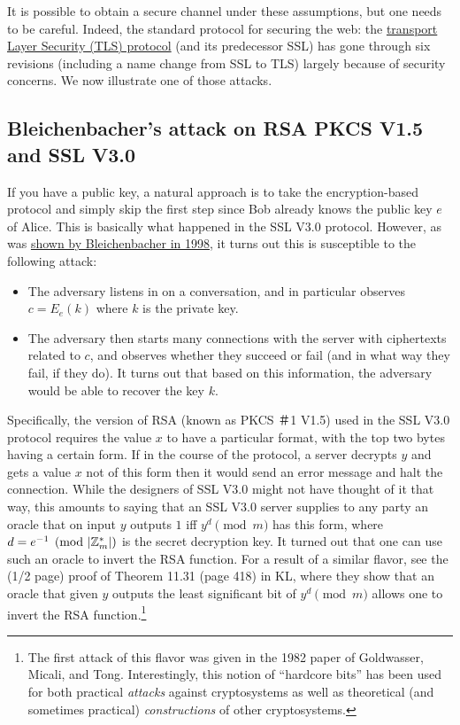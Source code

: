 It is possible to obtain a secure channel under these assumptions, but
one needs to be careful. Indeed, the standard protocol for securing the
web: the \href{https://goo.gl/md9Bsa}{transport Layer Security (TLS)
protocol} (and its predecessor SSL) has gone through six revisions
(including a name change from SSL to TLS) largely because of security
concerns. We now illustrate one of those attacks.

\subsection{Bleichenbacher's attack on RSA PKCS V1.5 and SSL
V3.0}\label{12-Bleichenbachers-attack}

If you have a public key, a natural approach is to take the
encryption-based protocol and simply skip the first step since Bob
already knows the public key \(e\) of Alice. This is basically what
happened in the SSL V3.0 protocol. However, as was
\href{http://archiv.infsec.ethz.ch/education/fs08/secsem/bleichenbacher98.pdf}{shown
by Bleichenbacher in 1998}, it turns out this is susceptible to the
following attack:

\begin{itemize}
\item
  The adversary listens in on a conversation, and in particular observes
  \(c=E_e(k)\) where \(k\) is the private key.
\item
  The adversary then starts many connections with the server with
  ciphertexts related to \(c\), and observes whether they succeed or
  fail (and in what way they fail, if they do). It turns out that based
  on this information, the adversary would be able to recover the key
  \(k\).
\end{itemize}

Specifically, the version of RSA (known as PKCS ＃1 V1.5) used in the
SSL V3.0 protocol requires the value \(x\) to have a particular format,
with the top two bytes having a certain form. If in the course of the
protocol, a server decrypts \(y\) and gets a value \(x\) not of this
form then it would send an error message and halt the connection. While
the designers of SSL V3.0 might not have thought of it that way, this
amounts to saying that an SSL V3.0 server supplies to any party an
oracle that on input \(y\) outputs \(1\) iff \(y^{d} \pmod{m}\) has this
form, where \(d = e^{-1} \pmod{|{\mathbb{Z}}^*_m|}\) is the secret decryption key.
It turned out that one can use such an oracle to invert the RSA
function. For a result of a similar flavor, see the (1/2 page) proof of
Theorem 11.31 (page 418) in KL, where they show that an oracle that
given \(y\) outputs the least significant bit of \(y^d \pmod{m}\) allows
one to invert the RSA function.\footnote{The first attack of this flavor
  was given in the 1982 paper of Goldwasser, Micali, and Tong.
  Interestingly, this notion of ``hardcore bits'' has been used for both
  practical \emph{attacks} against cryptosystems as well as theoretical
  (and sometimes practical) \emph{constructions} of other cryptosystems.}

